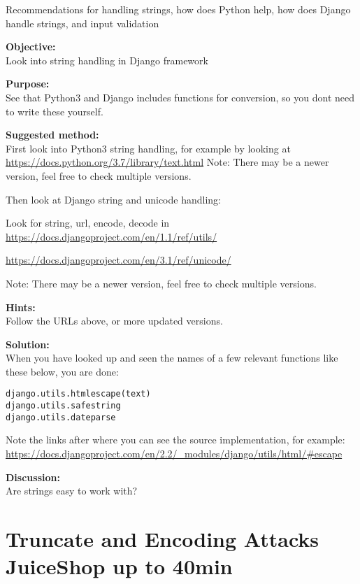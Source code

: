 \documentclass[a4paper,11pt,notitlepage]{report}
\begin{document}
Recommendations for handling strings, how does Python help, how does Django handle strings, and input validation

{\bf Objective:}\\
Look into string handling in Django framework

{\bf Purpose:}\\
See that Python3 and Django includes functions for conversion, so you dont need to write these yourself.

{\bf Suggested method:}\\
First look into Python3 string handling, for example by looking at\\
\url{https://docs.python.org/3.7/library/text.html}
Note: There may be a newer version, feel free to check multiple versions.

Then look at Django string and unicode handling:
\begin{list2}
\item Look for string, url, encode, decode in\\ \url{https://docs.djangoproject.com/en/1.1/ref/utils/}
\item \url{https://docs.djangoproject.com/en/3.1/ref/unicode/}
\end{list2}

Note: There may be a newer version, feel free to check multiple versions.

{\bf Hints:}\\
Follow the URLs above, or more updated versions.

{\bf Solution:}\\
When you have looked up and seen the names of a few relevant functions like these below, you are done:

\begin{alltt}
django.utils.html escape(text)
django.utils.safestring
django.utils.dateparse
\end{alltt}

Note the links after where you can see the source implementation, for example:\\
\url{https://docs.djangoproject.com/en/2.2/_modules/django/utils/html/#escape}


{\bf Discussion:}\\
Are strings easy to work with?


\chapter{Truncate and Encoding Attacks JuiceShop up to 40min}
\label{ex:truncate-encoding}
\end{document}
